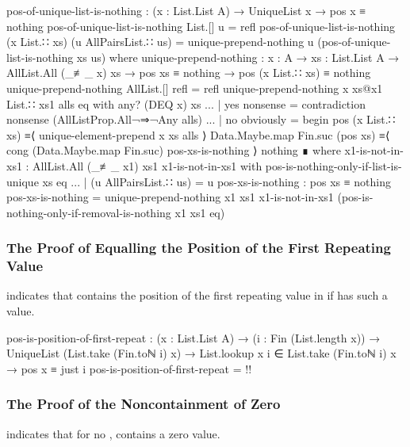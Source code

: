 \documentclass{report}
\begin{document}
\begin{code}
    pos-of-unique-list-is-nothing :
      (x : List.List A) →
      UniqueList x →
      pos x ≡ nothing
    pos-of-unique-list-is-nothing List.[] u = refl
    pos-of-unique-list-is-nothing (x List.∷ xs) (u AllPairsList.∷ us) =
      unique-prepend-nothing u (pos-of-unique-list-is-nothing xs us)
      where
      unique-prepend-nothing :
        {x : A} →
        {xs : List.List A} →
        AllList.All (_≢_ x) xs →
        pos xs ≡ nothing →
        pos (x List.∷ xs) ≡ nothing
      unique-prepend-nothing AllList.[] refl = refl
      unique-prepend-nothing {x} xs@{x1 List.∷ xs1} alls eq with any? (DEQ x) xs
      ... | yes nonsense = contradiction nonsense (AllListProp.All¬⇒¬Any alls)
      ... | no obviously = begin
        pos (x List.∷ xs)
          ≡⟨ unique-element-prepend x xs alls ⟩
        Data.Maybe.map Fin.suc (pos xs)
          ≡⟨ cong (Data.Maybe.map Fin.suc) pos-xs-is-nothing ⟩
        nothing ∎
        where
        x1-is-not-in-xs1 : AllList.All (_≢_ x1) xs1
        x1-is-not-in-xs1 with pos-is-nothing-only-if-list-is-unique xs eq
        ... | (u AllPairsList.∷ us) = u
        pos-xs-is-nothing : pos xs ≡ nothing
        pos-xs-is-nothing =
          unique-prepend-nothing {x1} {xs1}
                                 x1-is-not-in-xs1
                                 (pos-is-nothing-only-if-removal-is-nothing {x1} {xs1} eq)
\end{code}

\subsubsection{The Proof of Equalling the Position of the First Repeating Value}
 indicates that   contains the position of the first repeating value in  if  has such a value.

\begin{code}
    pos-is-position-of-first-repeat :
      (x : List.List A) →
      (i : Fin (List.length x)) →
      UniqueList (List.take (Fin.toℕ i) x) →
      List.lookup x i ∈ List.take (Fin.toℕ i) x →
      pos x ≡ just i
    pos-is-position-of-first-repeat = {!!}
\end{code}

\subsubsection{The Proof of the Noncontainment of Zero}
 indicates that for no ,   contains a zero value.
\end{document}
